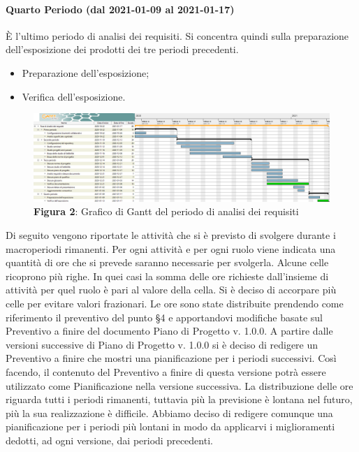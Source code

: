 \paragraph{Quarto Periodo (dal 2021-01-09 al 2021-01-17)}
È l'ultimo periodo di analisi dei requisiti. Si concentra quindi sulla preparazione dell'esposizione dei prodotti dei tre periodi precedenti.
\begin{itemize}
	\item Preparazione dell'esposizione;
	\item Verifica dell'esposizione.
\end{itemize}


\begin{landscape}
	\begin{figure}[H]
		\centering
		\includegraphics[width=\linewidth]{res/images/ganttFase1.png}
		\caption*{\textbf{Figura 2}{: Grafico di Gantt del periodo di analisi dei requisiti}}
		\label{fig:Gantt Analisi dei requisiti}
	\end{figure}
\end{landscape}



\noindent Di seguito vengono riportate le attività che si è previsto di svolgere durante i macroperiodi rimanenti. Per ogni attività e per ogni ruolo viene indicata una quantità di ore che si prevede saranno necessarie per svolgerla. Alcune celle ricoprono più righe. In quei casi la somma delle ore richieste dall'insieme di attività per quel ruolo è pari al valore della cella. Si è deciso di accorpare più celle per evitare valori frazionari. \newline
\indent Le ore sono state distribuite prendendo come riferimento il preventivo del punto §4 e apportandovi modifiche basate sul Preventivo a finire del documento Piano di Progetto v. 1.0.0. A partire dalle versioni successive di Piano di Progetto v. 1.0.0 si è deciso di redigere un Preventivo a finire che mostri una pianificazione per i periodi successivi. Così facendo, il contenuto del Preventivo a finire di questa versione potrà essere utilizzato come Pianificazione nella versione successiva. \newline
\indent La distribuzione delle ore riguarda tutti i periodi rimanenti, tuttavia più la previsione è lontana nel futuro, più la sua realizzazione è difficile. Abbiamo deciso di redigere comunque una pianificazione per i periodi più lontani in modo da applicarvi i miglioramenti dedotti, ad ogni versione, dai periodi precedenti. \newline

